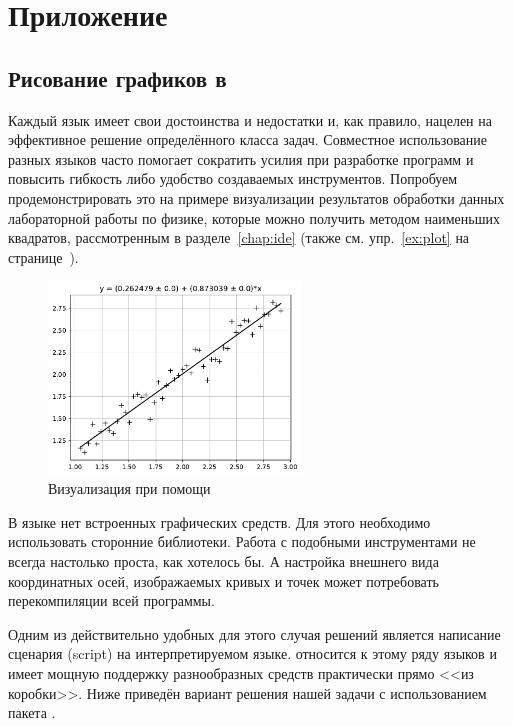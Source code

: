 
\chapter{Приложение}

\section{Рисование графиков в }\label{sect:pyplot}
Каждый язык имеет свои достоинства и недостатки и, как правило, нацелен на эффективное решение определённого класса задач. Совместное использование разных языков часто помогает сократить усилия при разработке программ и повысить гибкость либо удобство создаваемых инструментов. Попробуем продемонстрировать это на примере визуализации результатов обработки данных лабораторной работы по физике, которые можно получить методом наименьших квадратов, рассмотренным в разделе~\ref{chap:ide} (также см. упр.~\ref{ex:plot} на странице~\pageref{ex:plot}).

\begin{figure}[ht]
  {\centering
    \includegraphics[width=0.6\textwidth]{images/line_approx.pdf}

  }
  \caption{Визуализация при помощи }
  \label{fig:pyplot}
\end{figure}

В языке  нет встроенных графических средств. Для этого необходимо использовать сторонние библиотеки. Работа с подобными инструментами не всегда настолько проста, как хотелось бы. А настройка внешнего вида координатных осей, изображаемых кривых и точек может потребовать перекомпиляции всей программы.

Одним из действительно удобных для этого случая решений является написание сценария (\textenglish{script}) на интерпретируемом языке. \href{\pythonurl}{} относится к этому ряду языков и имеет мощную поддержку разнообразных средств практически прямо <<из коробки>>. Ниже приведён вариант решения нашей задачи с использованием пакета \href{\matplotliburl}{}.

